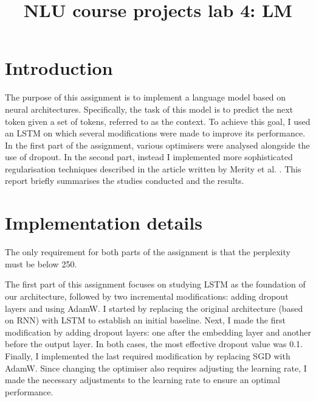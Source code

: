 \documentclass[a4paper]{article}
\title{NLU course projects lab 4: LM}
\begin{document}
\maketitle

\section{Introduction}
The purpose of this assignment is to implement a language model based on neural architectures.
Specifically, the task of this model is to predict the next token given a set of tokens, referred to as the context.
To achieve this goal, I used an LSTM on which several modifications were made to improve its performance. 
In the first part of the assignment, various optimisers were analysed alongside the use of dropout. In the second part, instead I implemented more sophisticated regularisation techniques described in the article written by Merity et al. \cite{merity2017regularizing}.
This report briefly summarises the studies conducted and the results.

\section{Implementation details}
The only requirement for both parts of the assignment is that the perplexity must be below 250.

The first part of this assignment focuses on studying LSTM as the foundation of our architecture, followed by two incremental modifications: adding dropout layers and using AdamW.
I started by replacing the original architecture (based on RNN) with LSTM to establish an initial baseline.
Next, I made the first modification by adding dropout layers: one after the embedding layer and another before the output layer. In both cases, the most effective dropout value was 0.1.
Finally, I implemented the last required modification by replacing SGD with AdamW. Since changing the optimiser also requires adjusting the learning rate, I made the necessary adjustments to the learning rate to ensure an optimal performance.
\end{document}
